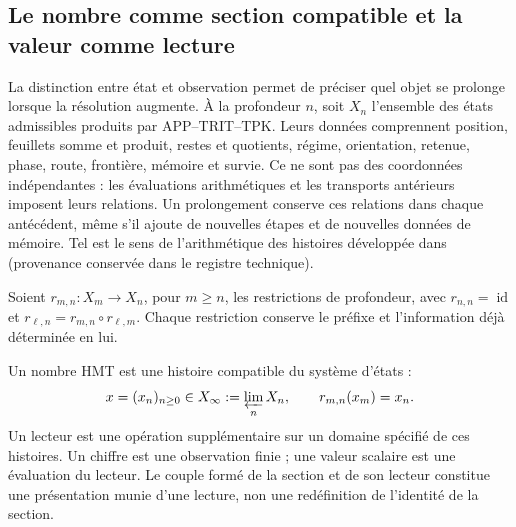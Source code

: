 
\subsection{Le nombre comme section compatible et la valeur comme lecture}
\label{hist:seccion}

La distinction entre état et observation permet de préciser quel objet se
prolonge lorsque la résolution augmente. À la profondeur \(n\), soit \(X_n\)
l’ensemble des états admissibles produits par APP--TRIT--TPK. Leurs données
comprennent position, feuillets somme et produit, restes et quotients, régime,
orientation, retenue, phase, route, frontière, mémoire et survie. Ce ne sont pas
des coordonnées indépendantes : les évaluations arithmétiques et les transports
antérieurs imposent leurs relations. Un prolongement conserve ces relations
dans chaque antécédent, même s’il ajoute de nouvelles étapes et de nouvelles données de mémoire.
Tel est le sens de l’arithmétique des histoires développée dans
\textup{(provenance conservée dans le registre technique)}.

Soient \(r_{m,n}:X_m\to X_n\), pour \(m\geq n\), les restrictions de
profondeur, avec \(r_{n,n}=\operatorname{id}\) et
\(r_{\ell,n}=r_{m,n}\circ r_{\ell,m}\). Chaque restriction conserve le
préfixe et l’information déjà déterminée en lui.

\begin{definition}
Un nombre HMT est une histoire compatible du système d’états :
\begin{equation}
 x=(x_n)_{n\geq0}\in X_\infty:=\varprojlim_n X_n,
 \qquad r_{m,n}(x_m)=x_n.
 \label{hist:limite-inverso}
\end{equation}
Un lecteur est une opération supplémentaire sur un domaine spécifié de ces
histoires. Un chiffre est une observation finie ; une valeur scalaire est une
évaluation du lecteur. Le couple formé de la section et de son lecteur constitue
une présentation munie d’une lecture, non une redéfinition de l’identité de la section.
\end{definition}

